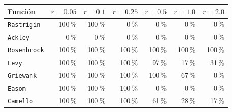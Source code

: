 \begin{tabular}{l r r r r r r}
\toprule
\rowcolor{Azul1!50}
Función & $r=0.05$ & $r=0.1$ & $r=0.25$ & $r=0.5$ & $r=1.0$ & $r=2.0$ \\
\midrule
\texttt{Rastrigin} & 100\,\% & 100\,\% & 0\,\% & 0\,\% & 0\,\% & 0\,\% \\
\texttt{Ackley} & 0\,\% & 0\,\% & 0\,\% & 0\,\% & 0\,\% & 0\,\% \\
\texttt{Rosenbrock} & 100\,\% & 100\,\% & 100\,\% & 100\,\% & 100\,\% & 100\,\% \\
\texttt{Levy} & 100\,\% & 100\,\% & 100\,\% & 97\,\% & 17\,\% & 31\,\% \\
\texttt{Griewank} & 100\,\% & 100\,\% & 100\,\% & 100\,\% & 67\,\% & 0\,\% \\
\texttt{Easom} & 100\,\% & 100\,\% & 100\,\% & 0\,\% & 0\,\% & 0\,\% \\
\texttt{Camello} & 100\,\% & 100\,\% & 100\,\% & 61\,\% & 28\,\% & 17\,\% \\
\bottomrule
\end{tabular}
